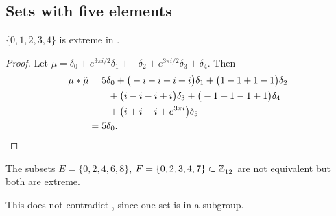 \bigbreak
\subsection{Sets with five elements}

\begin{prop}\label{prop5in6}
\cite{MR627683}
$\{0,1,2,3,4\}$ is extreme in .
\end{prop}

\begin{proof} Let $\mu =  \delta_{0}  +   e^{ 3\pi i  / 2}\delta_{1}  +    -\delta_{2}  +   e^{ 3\pi i  / 2}\delta_{3}  +  \delta_{4}$.
Then
\begin{align*}
 \mu * \tilde\mu&=  5\delta_{0}   +  \big( -i - i+  i +  i \big)\delta_{1} 
  +  \big(1-1+1-1\big)\delta_{2} 
  \\& \qquad +  \big(  i - i- i+  i \big)\delta_{3} 
   +  \big(  -1 +1-1+ 1\big)\delta_{4} 
  \\& \qquad
   +  \big(  i +  i - i+ e^{ 3 \pi i}\big)\delta_{5}  
   \\&=5\delta_0.\qedhere
 \end{align*}
\end{proof}


\begin{prop}
\cite{MR627683}
\label{prop5in12} The subsets $E=\{0,2,4,6,8\}$, $F=\{0,2,3,4,7\}\subset \texttt{$\mathbb Z_{12}^{\,}$}$
are not equivalent but both are extreme.
\end{prop}

\begin{remark} This does not contradict \cite{MR627683}, since one set is in a subgroup.
\end{remark}

